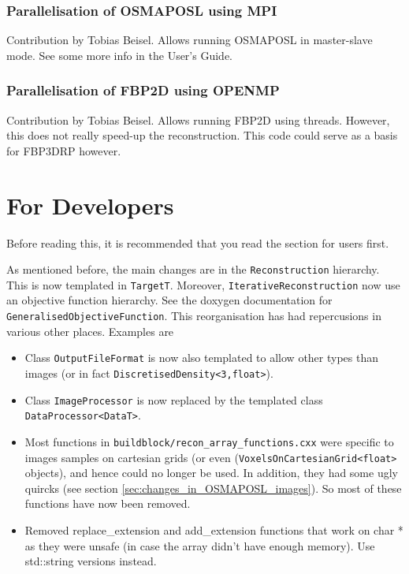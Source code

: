 \documentclass{article}
\begin{document}
\subsubsection{Parallelisation of OSMAPOSL using MPI}
Contribution by Tobias Beisel. Allows running OSMAPOSL in master-slave mode.
See some more info in the User's Guide.
\subsubsection{Parallelisation of FBP2D using OPENMP}
Contribution by Tobias Beisel. Allows running FBP2D using threads.
However, this does not really speed-up the reconstruction. This code could
serve as a basis for FBP3DRP however.

\section{For Developers}

Before reading this, it is recommended that you read the section for
users first.

As mentioned before, the main changes are in the \texttt{Reconstruction}
hierarchy. This is now templated in \texttt{TargetT}. Moreover,
\texttt{IterativeReconstruction} now use an objective function hierarchy. See 
the doxygen documentation for \texttt{GeneralisedObjectiveFunction}. This
reorganisation has had repercusions in various other places. Examples are
\begin{itemize}
\item Class \texttt{OutputFileFormat} is now also templated to allow
other types than images (or in fact \texttt{DiscretisedDensity<3,float>}).
\item Class \texttt{ImageProcessor} is now replaced by the templated
class \texttt{DataProcessor<DataT>}.
\item Most functions in \texttt{buildblock/recon\_array\_functions.cxx}
were specific to images samples on cartesian grids 
(or even (\texttt{VoxelsOnCartesianGrid<float>} objects), and hence
could no longer be used. In addition, they had some ugly quircks
(see section \ref{sec:changes_in_OSMAPOSL_images}). So most of these
functions have now been removed.
\item Removed replace_extension and add_extension functions that work on char * as they were 
unsafe (in case the array didn't have enough memory). Use std::string versions instead.

\end{itemize}
\end{document}
